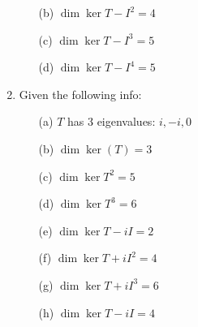 \documentclass{article}
\begin{document}
\begin{examples}[frametitle={Examples}]
\begin{enumerate}
\begin{enumerate}
				\item [(b)] $\dim{\ker{T - I}^{2}} = 4$

				\item [(c)] $\dim{\ker{T - I}^{3}} = 5$ 

				\item [(d)] $\dim{\ker{T - I}^{4}} = 5$
			\end{enumerate}

		\item Given the following info:
			\begin{enumerate}
				\item [(a)] $T$ has 3 eigenvalues: $i, -i, 0$

				\item [(b)] $\dim{\ker{(T)}} = 3$ 

				\item [(c)] $\dim{\ker{T^{2}}} = 5$

				\item [(d)] $\dim{\ker{T^{3}}} = 6$

				\item [(e)] $\dim{\ker{T - iI}} = 2$ 

				\item [(f)] $\dim{\ker{T + iI}^{2}} = 4$

				\item [(g)] $\dim{\ker{T + iI}^{3}} = 6$

				\item [(h)] $\dim{\ker{T - iI}} = 4$


\end{enumerate}
\end{enumerate}
\end{examples}
\end{document}
